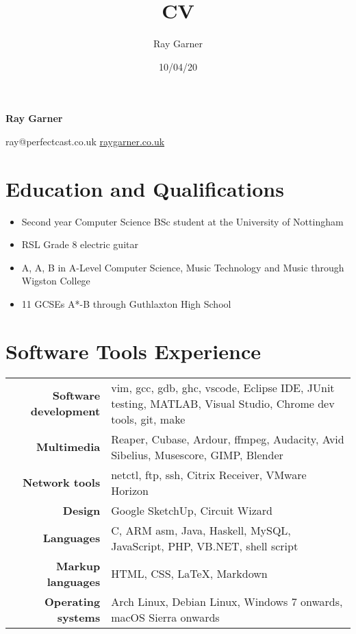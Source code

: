 \documentclass{article}
\title{CV}
\date{10/04/20}
\author{Ray Garner}
\makeatletter
\renewcommand{\maketitle}{
\vskip -5cm
\begin{center}


{\huge\bfseries
Ray Garner}

\vskip 0.25cm

{\large
ray@perfectcast.co.uk\hspace{0.5cm}
\href{https://www.raygarner.co.uk}{raygarner.co.uk}}

\vskip 1cm

\end{center}
}
\makeatother
\begin{document}
\maketitle

\section{Education and Qualifications}

\begin{itemize}[noitemsep]

\renewcommand{\labelitemi}{$\square$}
\item Second year Computer Science BSc student at the University of Nottingham
\item RSL Grade 8 electric guitar
\item A, A, B in A-Level Computer Science, Music Technology and Music through Wigston College
\item 11 GCSEs A*-B through Guthlaxton High School

\end{itemize}

\section{Software Tools Experience}

\renewcommand{\arraystretch}{1.4}

\begin{tabular}{ r | p{11cm} }

{\large\bfseries Software development} & {vim, gcc, gdb, ghc, vscode, Eclipse IDE, JUnit testing, MATLAB, Visual Studio, Chrome dev tools, git, make}\\
{\large\bfseries Multimedia} & {Reaper, Cubase, Ardour, ffmpeg, Audacity, Avid Sibelius, Musescore, GIMP, Blender} \\
{\large\bfseries Network tools} & {netctl, ftp, ssh, Citrix Receiver, VMware Horizon} \\
{\large\bfseries Design} & {Google SketchUp, Circuit Wizard} \\
{\large\bfseries Languages} & {C, ARM asm, Java, Haskell, MySQL, JavaScript, PHP, VB.NET, shell script}\\
{\large\bfseries Markup languages} & {HTML, CSS, \LaTeX, Markdown}\\
{\large\bfseries Operating systems} & {Arch Linux, Debian Linux, Windows 7 onwards, macOS Sierra onwards}\\
\end{tabular}
\end{document}
